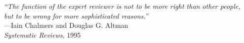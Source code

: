 %

\begin{flushright}
\null{}
\textit{``The function of the expert reviewer is not to be more right than other people, \\
but to be wrong for more sophisticated reasons.''} \\
---Iain Chalmers and Douglas G. Altman \\ 
\textit{Systematic Reviews}, 1995
\null
\end{flushright}


\iffalse
\begin{flushright}
\null\vspace{\stretch{1}}
\textit{``If I have seen further, it is by standing on the shoulders of giants.''} \\
---Isaac Newton
\vspace{\stretch{2}}\null
\end{flushright}
\fi
